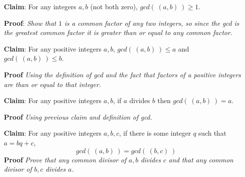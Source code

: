 
{\bf Claim}: For any integers $a,b$ (not both zero), $gcd(~(a,b)~) \geq 1$.

{\bf Proof}: {\it Show that $1$ is a common factor of any two integers, so since the gcd 
is the greatest common factor it is greater than or equal to any common factor.}

\vspace{150pt}

{\bf Claim}: For any positive integers $a,b$, $gcd(~(a,b)~) \leq a$ and $gcd( ~(a,b)~) \leq b$.

{\bf Proof} {\it Using the definition of gcd and the fact that factors of a positive integers
are than or equal to that integer.}

\vspace{150pt}

{\bf Claim}: For any positive integers $a,b$, if $a$ divides $b$ then $gcd(~(a,b)~) = a$.

{\bf Proof} {\it Using previous claim and definition of gcd.}

\vspace{150pt}


{\bf Claim}: For any positive integers $a,b,c$, if there is some integer $q$ such that $a = bq + c$,
\[
    gcd(~(a,b)~) = gcd (~(b,c)~)
\]
{\bf Proof} {\it Prove that any common divisor of $a,b$ divides $c$ and that any common 
divisor of $b,c$ divides $a$.}

\vspace{150pt}
